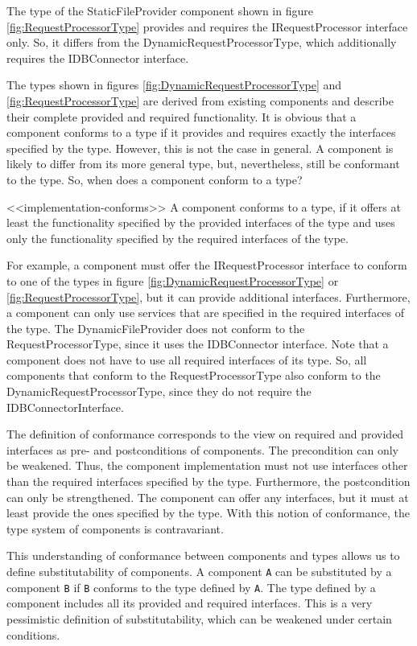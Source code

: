The type of the StaticFileProvider component shown in figure
\ref{fig:RequestProcessorType} provides and requires the IRequestProcessor
interface only. So, it differs from the DynamicRequestProcessorType, which
additionally requires the IDBConnector interface. 

The types shown in figures \ref{fig:DynamicRequestProcessorType} and
\ref{fig:RequestProcessorType} are derived from existing components and describe
their complete provided and required functionality.
It is obvious that a component conforms to a type if it provides and requires
exactly the interfaces specified by the type. However, this is not the case in
general. A component is likely to differ from its more general type, but,
nevertheless, still be conformant to the type. So, when does a component conform
to a type?

<<implementation-conforms>>
A component conforms to a type, if it offers at least the functionality
specified by the provided interfaces of the type and uses only the functionality
specified by the required interfaces of the type.

For example, a component must offer the IRequestProcessor interface to conform
to one of the types in figure \ref{fig:DynamicRequestProcessorType} or
\ref{fig:RequestProcessorType}, but it can provide additional interfaces.
Furthermore, a component can only use services that are specified in the
required interfaces of the type. The DynamicFileProvider does not conform to the
RequestProcessorType, since it uses the IDBConnector interface. Note that a
component does not have to use all required interfaces of its type. So, all
components that conform to the RequestProcessorType also conform to the
DynamicRequestProcessorType, since they do not require the
IDBConnectorInterface. 

The definition of conformance corresponds to the view on required and provided
interfaces as pre- and postconditions of components. The precondition can only
be weakened. Thus, the component implementation must not use interfaces other
than the required interfaces specified by the type. Furthermore, the
postcondition can only be strengthened. The component can offer any interfaces,
but it must at least provide the ones specified by the type. With this notion of
conformance, the type system of components is contravariant.

This understanding of conformance between components and types allows us to
define substitutability of components. A component \texttt{A} can be substituted
by a component \texttt{B} if \texttt{B} conforms to the type defined by
\texttt{A}. The type defined by a component includes all its provided and
required interfaces. This is a very pessimistic definition of substitutability,
which can be weakened under certain conditions. 

